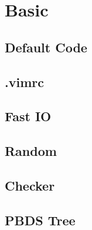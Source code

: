 \documentclass{article}
\begin{document}
\setlength\parindent{0pt}
\setlength\columnseprule{0.5pt}
\footnotesize


\pagestyle{fancy}
\fancyfoot{}
\fancyhead[R]{\thepage}

\twocolumn

\tableofcontents

\section{Basic}

\subsection{Default Code}


\subsection{.vimrc}


%

%

\subsection{Fast IO}


\subsection{Random}


\subsection{Checker}


\subsection{PBDS Tree}

\end{document}
